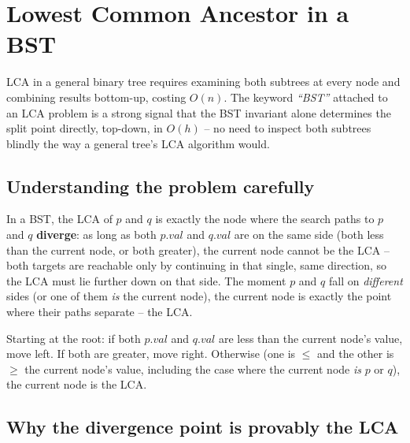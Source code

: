 \section{Lowest Common Ancestor in a BST}
\label{sec:bst-lca}


\begin{patternbox}
LCA in a general binary tree requires examining both subtrees at every
node and combining results bottom-up, costing $O(n)$. The keyword
\emph{``BST''} attached to an LCA problem is a strong signal that the
BST invariant alone determines the split point directly, top-down, in
$O(h)$ -- no need to inspect both subtrees blindly the way a general
tree's LCA algorithm would.
\end{patternbox}

\subsection*{Understanding the problem carefully}

In a BST, the LCA of $p$ and $q$ is exactly the node where the search
paths to $p$ and $q$ \textbf{diverge}: as long as both $p.\textit{val}$
and $q.\textit{val}$ are on the same side (both less than the current
node, or both greater), the current node cannot be the LCA -- both
targets are reachable only by continuing in that single, same direction,
so the LCA must lie further down on that side. The moment $p$ and $q$
fall on \emph{different} sides (or one of them \emph{is} the current
node), the current node is exactly the point where their paths separate
-- the LCA.

\begin{ideabox}
Starting at the root: if both $p.\textit{val}$ and $q.\textit{val}$ are
less than the current node's value, move left. If both are greater, move
right. Otherwise (one is $\le$ and the other is $\ge$ the current node's
value, including the case where the current node \emph{is} $p$ or $q$),
the current node is the LCA.
\end{ideabox}

\subsection*{Why the divergence point is provably the LCA}

